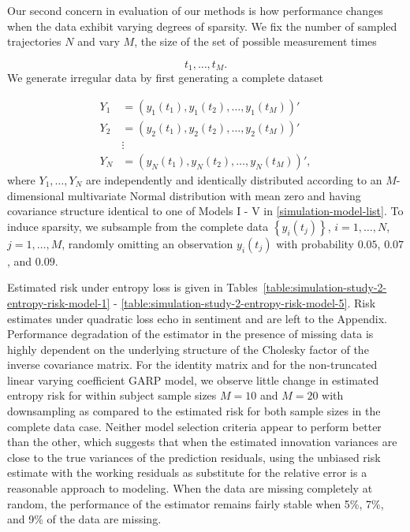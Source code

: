 Our second concern in evaluation of our methods is how performance changes when the data exhibit varying degrees of sparsity. We fix the number of sampled trajectories $N$ and vary $M$, the size of the set  of possible measurement times

\[
t_1,\dots, t_M.
\]
\noindent
We generate irregular data by first generating a complete dataset 

\begin{align*}
Y_1 &= \left(y_1\left(t_1\right), y_1\left(t_2\right), \dots, y_1\left(t_M\right)\right)' \\
Y_2 &= \left(y_2\left(t_1\right), y_2\left(t_2\right), \dots, y_2\left(t_M\right)\right)' \\
&\vdots \\
Y_N &= \left(y_N\left(t_1\right), y_N\left(t_2\right), \dots, y_N\left(t_M\right)\right)',
\end{align*}
\noindent
where $Y_1,\dots, Y_N$ are independently and identically distributed according to an $M$-dimensional multivariate Normal distribution with mean zero and having covariance structure identical to one of Models I - V in \ref{simulation-model-list}. To induce sparsity, we subsample from the complete data $\left\{y_i\left(t_j\right) \right\}$, $i = 1,\dots, N$, $j = 1,\dots, M$, randomly omitting an observation $y_i\left(t_j\right)$ with probability $0.05$, $0.07$, and $0.09$.

\bigskip

Estimated risk under entropy loss is given in Tables~\ref{table:simulation-study-2-entropy-risk-model-1} - \ref{table:simulation-study-2-entropy-risk-model-5}.  Risk estimates under quadratic loss echo in sentiment and are left to the Appendix.  Performance degradation of the estimator in the presence of missing data is highly dependent on the underlying structure of the Cholesky factor of the inverse covariance matrix. For the identity matrix and for the non-truncated linear varying coefficient GARP model, we observe little change in estimated entropy risk for within subject sample sizes $M = 10$ and $M = 20$ with downsampling as compared to the estimated risk for both sample sizes in the complete data case.  Neither model selection criteria appear to perform better than the other, which suggests that when the estimated innovation variances are close to the true variances of the prediction residuals, using the unbiased risk estimate with the working residuals as substitute for the relative error is a reasonable approach to modeling. When the data are missing completely at random, the performance of the estimator remains fairly stable when 5\%, 7\%, and 9\% of the data are missing. 

